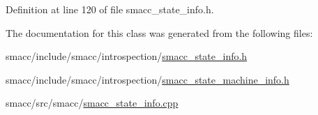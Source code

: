 Definition at line 120 of file smacc\+\_\+state\+\_\+info.\+h.



The documentation for this class was generated from the following files\+:\begin{DoxyCompactItemize}
\item 
smacc/include/smacc/introspection/\hyperlink{smacc__state__info_8h}{smacc\+\_\+state\+\_\+info.\+h}\item 
smacc/include/smacc/introspection/\hyperlink{smacc__state__machine__info_8h}{smacc\+\_\+state\+\_\+machine\+\_\+info.\+h}\item 
smacc/src/smacc/\hyperlink{smacc__state__info_8cpp}{smacc\+\_\+state\+\_\+info.\+cpp}\end{DoxyCompactItemize}
